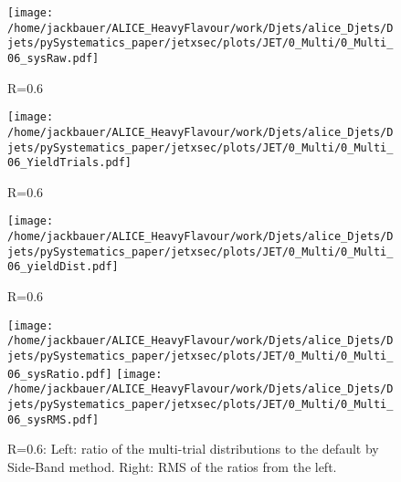 \begin{figure}[bth]
\centering
\texttt{[image: /home/jackbauer/ALICE\_HeavyFlavour/work/Djets/alice\_Djets/Djets/pySystematics\_paper/jetxsec/plots/JET/0\_Multi/0\_Multi\_06\_sysRaw.pdf]}
\caption{R=0.6}
\label{fig:MTYieldsPerDptBin_pp_DzeroR06}
\end{figure}
\begin{figure}[bth]
\centering
\texttt{[image: /home/jackbauer/ALICE\_HeavyFlavour/work/Djets/alice\_Djets/Djets/pySystematics\_paper/jetxsec/plots/JET/0\_Multi/0\_Multi\_06\_YieldTrials.pdf]}
\caption{R=0.6
}
\label{fig:MTYieldsPerJetBin_pp_DzeroR06}
\end{figure}
\begin{figure}[bth]
\centering
\texttt{[image: /home/jackbauer/ALICE\_HeavyFlavour/work/Djets/alice\_Djets/Djets/pySystematics\_paper/jetxsec/plots/JET/0\_Multi/0\_Multi\_06\_yieldDist.pdf]}
\caption{R=0.6}
\label{fig:MTYieldDistPerJetBin_pp_DzeroR06}
\end{figure}
\begin{figure}[bth]
\centering
\texttt{[image: /home/jackbauer/ALICE\_HeavyFlavour/work/Djets/alice\_Djets/Djets/pySystematics\_paper/jetxsec/plots/JET/0\_Multi/0\_Multi\_06\_sysRatio.pdf]}
\texttt{[image: /home/jackbauer/ALICE\_HeavyFlavour/work/Djets/alice\_Djets/Djets/pySystematics\_paper/jetxsec/plots/JET/0\_Multi/0\_Multi\_06\_sysRMS.pdf]}
\caption{R=0.6: Left: ratio of the multi-trial distributions to the default by Side-Band method. Right: RMS of the ratios from the left. 
}
\label{fig:MTRatioRMS_pp_DzeroR06}
\end{figure}
\FloatBarrier
